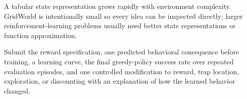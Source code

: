 \begin{pitfall}
A tabular state representation grows rapidly with environment complexity. GridWorld is intentionally small so every idea can be inspected directly; larger reinforcement-learning problems usually need better state representations or function approximation.
\end{pitfall}

\begin{labdeliverable}
Submit the reward specification, one predicted behavioral consequence before training, a learning curve, the final greedy-policy success rate over repeated evaluation episodes, and one controlled modification to reward, trap location, exploration, or discounting with an explanation of how the learned behavior changed.
\end{labdeliverable}

